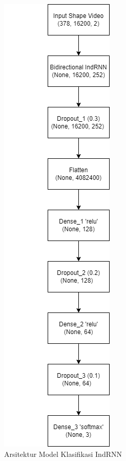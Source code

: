 \begin{figure} [H] \centering
      \includegraphics[scale=0.7]{gambar/arsitekturmodel.png}
      \caption{Arsitektur Model Klasifikasi IndRNN}
      \label{fig:arsitekturmodel}
\end{figure}

